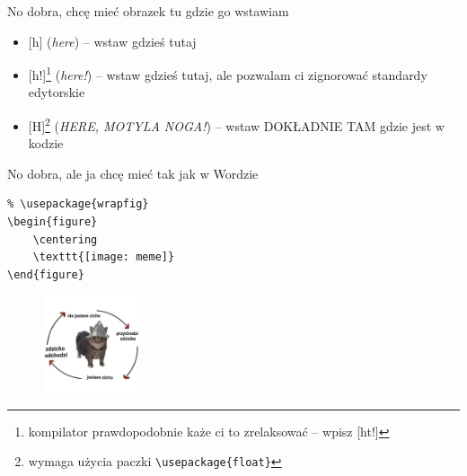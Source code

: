 \documentclass[handout]{beamer}
\newcommand{\tb}{\textbackslash}
\begin{document}
\begin{frame}{No dobra, chcę mieć obrazek tu gdzie go wstawiam}
    \begin{itemize}
        \item{} [h] (\emph{here}) -- wstaw gdzieś tutaj
        \item{} [h!]\footnote{kompilator prawdopodobnie każe ci to zrelaksować -- wpisz [ht!]} (\emph{here!}) -- wstaw gdzieś tutaj, ale pozwalam ci zignorować standardy edytorskie
        \item{} [H]\footnote{wymaga użycia paczki \texttt{\tb{usepackage\{float\}}}} (\emph{HERE, MOTYLA NOGA!}) -- wstaw DOKŁADNIE TAM gdzie jest w kodzie
    \end{itemize}
\end{frame}

\begin{frame}[fragile]{No dobra, ale ja chcę mieć tak jak w Wordzie}{}



    \begin{verbatim}
% \usepackage{wrapfig}
\begin{figure}
    \centering
    \texttt{[image: meme]}
\end{figure}
    \end{verbatim}
    
    \begin{figure}
    \centering
    \includegraphics[width=0.25\textwidth]{memy/mem5.png}
\end{figure}%


\end{frame}
\end{document}
